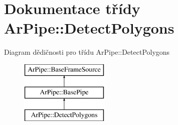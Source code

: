 \hypertarget{class_ar_pipe_1_1_detect_polygons}{\section{Dokumentace třídy Ar\-Pipe\-:\-:Detect\-Polygons}
\label{da/d76/class_ar_pipe_1_1_detect_polygons}
}
Diagram dědičnosti pro třídu Ar\-Pipe\-:\-:Detect\-Polygons\begin{figure}[H]
\begin{center}
\leavevmode
\includegraphics[height=3.000000cm]{da/d76/class_ar_pipe_1_1_detect_polygons}
\end{center}
\end{figure}

